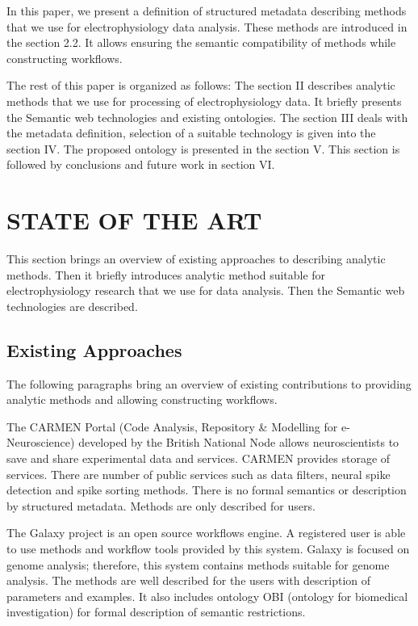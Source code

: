 \documentclass[a4paper,twoside]{article}
\begin{document}
In this paper, we present a definition of structured metadata describing methods that we use for electrophysiology data analysis. These methods are introduced in the section 2.2. It allows ensuring the semantic compatibility of methods while constructing workflows.

The rest of this paper is organized as follows: The section II describes analytic methods that we use for processing of electrophysiology data. It briefly presents the Semantic web technologies and existing ontologies. The section III deals with the metadata definition, selection of a suitable technology is given into the section IV. The proposed ontology is presented in the section V. This section is followed by conclusions and future work in section VI.

\section{\uppercase{State of the Art}}

\noindent This section brings an overview of existing approaches to describing analytic methods. Then it briefly introduces analytic method suitable for electrophysiology research that we use for data analysis. Then the Semantic web technologies are described.

\subsection{Existing Approaches}

The following paragraphs bring an overview of existing contributions to providing  analytic methods and allowing constructing workflows.

The CARMEN Portal \cite{Watson07} (Code Analysis, Repository \& Modelling for e-Neuroscience) developed by the British National Node allows neuroscientists to save and share experimental data and services. CARMEN provides storage of services. There are number of public services such as data filters, neural spike detection and spike sorting methods. There is no formal semantics or description by structured metadata. Methods are only described for users.

The Galaxy project \cite{goecks2010galaxy, blankenberg2010galaxy, giardine2005galaxy} is an open source workflows engine. A registered user is able to use methods and workflow tools provided by this system. Galaxy is focused on genome analysis; therefore, this system contains methods suitable for genome analysis. The methods are well described for the users with description of parameters and examples. It also includes ontology OBI (ontology for biomedical investigation) for formal description of semantic restrictions.
\end{document}
